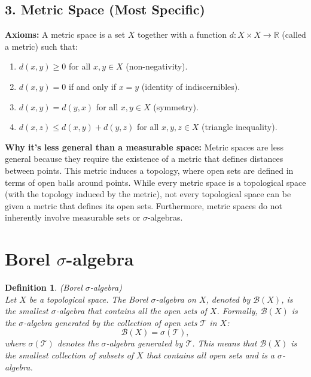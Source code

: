 \documentclass[11pt]{book}
\numberwithin{equation}{chapter}
\theoremstyle{boldStyle}
\newtheorem{definition}{Definition}[section]
\begin{document}
\vspace{10pt}

\subsection*{3. Metric Space (Most Specific)}

\textbf{Axioms:} A metric space is a set \( X \) together with a function \( d: X \times X \to \mathbb{R} \) (called a metric) such that:
\begin{enumerate}
    \item \( d(x, y) \geq 0 \) for all \( x, y \in X \) (non-negativity).
    \item \( d(x, y) = 0 \) if and only if \( x = y \) (identity of indiscernibles).
    \item \( d(x, y) = d(y, x) \) for all \( x, y \in X \) (symmetry).
    \item \( d(x, z) \leq d(x, y) + d(y, z) \) for all \( x, y, z \in X \) (triangle inequality).
\end{enumerate}

\textbf{Why it's less general than a measurable space:} Metric spaces are less general because they require the existence of a metric that defines distances between points. This metric induces a topology, where open sets are defined in terms of open balls around points. While every metric space is a topological space (with the topology induced by the metric), not every topological space can be given a metric that defines its open sets. Furthermore, metric spaces do not inherently involve measurable sets or \(\sigma\)-algebras.


\section{Borel $\sigma$-algebra}


\begin{definition}(Borel \(\sigma\)-algebra) \\
    Let \(X\) be a topological space. The Borel \(\sigma\)-algebra on \(X\), denoted by \(\mathcal{B}(X)\), is the smallest \(\sigma\)-algebra that contains all the open sets of \(X\). Formally, \(\mathcal{B}(X)\) is the \(\sigma\)-algebra generated by the collection of open sets \(\mathcal{T}\) in \(X\):
    \[
    \mathcal{B}(X) = \sigma(\mathcal{T}),
    \]
    where \(\sigma(\mathcal{T})\) denotes the \(\sigma\)-algebra generated by \(\mathcal{T}\). 
    This means that \(\mathcal{B}(X)\) is the smallest collection of subsets of \(X\) that contains all open sets and is
    a \(\sigma\)-algebra.
\end{definition}
\end{document}
